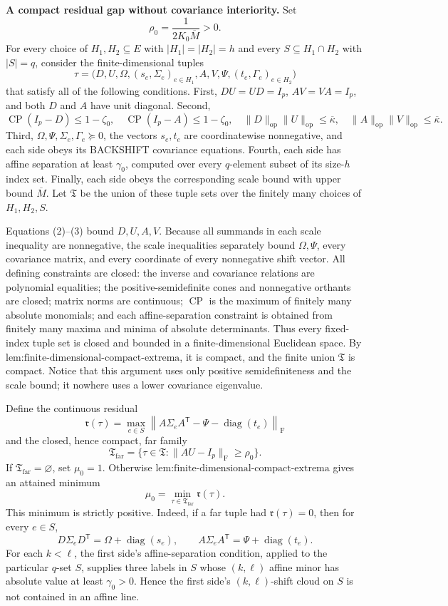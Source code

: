 \textbf{A compact residual gap without covariance interiority.}
Set
\[
\rho_0=\frac{1}{2K_0\overline M}>0.
\tag{4}
\]
For every choice of \(H_1,H_2\subseteq E\) with \(|H_1|=|H_2|=h\) and every \(S\subseteq H_1\cap H_2\) with \(|S|=q\), consider the finite-dimensional tuples
\[
\tau=\bigl(D,U,\Omega,(s_e,\Sigma_e)_{e\in H_1},
A,V,\Psi,(t_e,\Gamma_e)_{e\in H_2}\bigr)
\]
that satisfy all of the following conditions. First, \(DU=UD=I_p\), \(AV=VA=I_p\), and both \(D\) and \(A\) have unit diagonal. Second,
\[
\operatorname{CP}(I_p-D)\leq1-\zeta_0,
\quad
\operatorname{CP}(I_p-A)\leq1-\zeta_0,
\quad
\|D\|_{\mathrm{op}}\|U\|_{\mathrm{op}}\leq\overline\kappa,
\quad
\|A\|_{\mathrm{op}}\|V\|_{\mathrm{op}}\leq\overline\kappa.
\]
Third, \(\Omega,\Psi,\Sigma_e,\Gamma_e\succeq0\), the vectors \(s_e,t_e\) are coordinatewise nonnegative, and each side obeys its BACKSHIFT covariance equations. Fourth, each side has affine separation at least \(\gamma_0\), computed over every \(q\)-element subset of its size-\(h\) index set. Finally, each side obeys the corresponding scale bound with upper bound \(\overline M\). Let \(\mathfrak T\) be the union of these tuple sets over the finitely many choices of \(H_1,H_2,S\).

Equations (2)--(3) bound \(D,U,A,V\). Because all summands in each scale inequality are nonnegative, the scale inequalities separately bound \(\Omega,\Psi\), every covariance matrix, and every coordinate of every nonnegative shift vector. All defining constraints are closed: the inverse and covariance relations are polynomial equalities; the positive-semidefinite cones and nonnegative orthants are closed; matrix norms are continuous; \(\operatorname{CP}\) is the maximum of finitely many absolute monomials; and each affine-separation constraint is obtained from finitely many maxima and minima of absolute determinants. Thus every fixed-index tuple set is closed and bounded in a finite-dimensional Euclidean space. By \(\text{lem:finite-dimensional-compact-extrema}\), it is compact, and the finite union \(\mathfrak T\) is compact. Notice that this argument uses only positive semidefiniteness and the scale bound; it nowhere uses a lower covariance eigenvalue.

Define the continuous residual
\[
\mathfrak r(\tau)=
\max_{e\in S}
\left\|A\Sigma_eA^{\mathsf T}
-\Psi-\operatorname{diag}(t_e)\right\|_{\mathrm F}
\]
and the closed, hence compact, far family
\[
\mathfrak T_{\mathrm{far}}
=\{\tau\in\mathfrak T:\|AU-I_p\|_{\mathrm F}\geq\rho_0\}.
\]
If \(\mathfrak T_{\mathrm{far}}=\varnothing\), set \(\mu_0=1\). Otherwise \(\text{lem:finite-dimensional-compact-extrema}\) gives an attained minimum
\[
\mu_0=\min_{\tau\in\mathfrak T_{\mathrm{far}}}\mathfrak r(\tau).
\tag{5}
\]
This minimum is strictly positive. Indeed, if a far tuple had \(\mathfrak r(\tau)=0\), then for every \(e\in S\),
\[
D\Sigma_eD^{\mathsf T}=\Omega+\operatorname{diag}(s_e),
\qquad
A\Sigma_eA^{\mathsf T}=\Psi+\operatorname{diag}(t_e).
\tag{6}
\]
For each \(k<\ell\), the first side's affine-separation condition, applied to the particular \(q\)-set \(S\), supplies three labels in \(S\) whose \((k,\ell)\) affine minor has absolute value at least \(\gamma_0>0\). Hence the first side's \((k,\ell)\)-shift cloud on \(S\) is not contained in an affine line.

